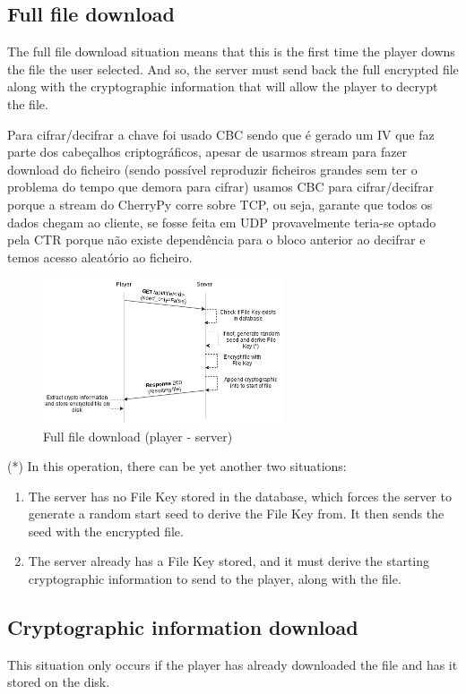 \documentclass[11pt,a4paper]{report}
\begin{document}
\subsection{Full file download}
The full file download situation means that this is the first time the player downs the file the user selected.
And so, the server must send back the full encrypted file along with the cryptographic information that will allow the player to decrypt the file.

Para cifrar/decifrar a chave foi usado CBC sendo que é gerado um IV que faz parte dos cabeçalhos criptográficos, apesar de usarmos stream para fazer download do ficheiro (sendo possível reproduzir ficheiros grandes sem ter o problema do tempo que demora para cifrar) usamos CBC para cifrar/decifrar porque a stream do CherryPy corre sobre TCP, ou seja, garante que todos os dados chegam ao cliente, se fosse feita em UDP provavelmente teria-se optado pela CTR porque não existe dependência para o bloco anterior ao decifrar e temos acesso aleatório ao ficheiro. 

\begin{figure}[H]
\centerline{\includegraphics[width=200pt]{images/fullFileDown.png}}
\caption{Full file download (player - server)}
\label{player}
\end{figure}

(*) In this operation, there can be yet another two situations:

\begin{enumerate}
  \item The server has no File Key stored in the database, which forces the server to generate a random start seed to derive the File Key from. It then sends the seed with the encrypted file.
  \item The server already has a File Key stored, and it must derive the starting cryptographic information to send to the player, along with the file.
\end{enumerate}

\subsection{Cryptographic information download}
This situation only occurs if the player has already downloaded the file and has it stored on the disk.
\end{document}
